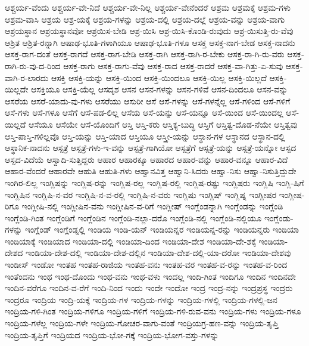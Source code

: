 {ಆಶ್ಚರ್ಯ-ವೆಂದು
ಆಶ್ಚರ್ಯ-ವೇ-ನಿದೆ
ಆಶ್ಚರ್ಯ-ವೇ-ನಿಲ್ಲ
ಆಶ್ಚರ್ಯ-ವೇನೆಂದರೆ
ಆಶ್ರಮ
ಆಶ್ರಮಕ್ಕೆ
ಆಶ್ರಮ-ಗಳು
ಆಶ್ರಮ-ವಾಸಿ
ಆಶ್ರಯ
ಆಶ್ರ-ಯಕ್ಕೆ
ಆಶ್ರಯ-ಗಳನ್ನು
ಆಶ್ರಯ-ದಲ್ಲಿ
ಆಶ್ರಯ-ದಲ್ಲೆ
ಆಶ್ರಯ-ವನ್ನು
ಆಶ್ರಯ-ವಾಗು
ಆಶ್ರಯಸ್ಥಾನ
ಆಶ್ರಯಸ್ಥಾನವೋ
ಆಶ್ರಯಿಸ-ಬೇಡಿ
ಆಶ್ರ-ಯಿಸಿ
ಆಶ್ರ-ಯಿಸಿ-ಕೊಂಡಿ-ರುವುದು
ಆಶ್ರ-ಯಿಸುತ್ತಿ-ರು-ವೆವು
ಆಶ್ರಿತ
ಆಶ್ರಿತ-ರನ್ನಾಗಿ
ಆಷಾಢ-ಭೂತಿ-ಗಳಾಗಿಯೂ
ಆಷಾಢ-ಭೂತಿ-ಗಳೂ
ಆಸಕ್ತ
ಆಸಕ್ತ-ನಾಗ-ಬೇಡ
ಆಸಕ್ತ-ನಾದನು
ಆಸಕ್ತ-ರಾಗ-ದಂತೆ
ಆಸಕ್ತ-ರಾಗದೆ
ಆಸಕ್ತ-ರಾಗ-ಬೇಡಿ
ಆಸಕ್ತ-ರಾಗಿ
ಆಸಕ್ತ-ರಾಗಿ-ರ-ಬೇಕು
ಆಸಕ್ತ-ರಾ-ಗಿ-ರು-ವರು
ಆಸಕ್ತ-ರಾಗಿ-ರು-ವು-ದ-ರಿಂದ
ಆಸಕ್ತ-ರಾಗು
ಆಸಕ್ತ-ರಾಗು-ವೆವು
ಆಸಕ್ತ-ರಾದ
ಆಸಕ್ತ-ರಾದರೆ
ಆಸಕ್ತ-ವಾ-ಗಿತ್ತು-ಏ-ಸುವು
ಆಸಕ್ತ-ವಾಗಿ-ರ-ಲಾರದು
ಆಸಕ್ತಿ
ಆಸಕ್ತಿ-ಯನ್ನು
ಆಸಕ್ತಿ-ಯಿಂದ
ಆಸಕ್ತಿ-ಯಿಂದಲೂ
ಆಸಕ್ತಿ-ಯಿಲ್ಲ
ಆಸಕ್ತಿ-ಯಿಲ್ಲದೆ
ಆಸಕ್ತಿ-ಯಿಲ್ಲದೇ
ಆಸಕ್ತಿಯೂ
ಆಸಕ್ತಿ-ಯೆಲ್ಲ
ಆಸದೃಶ
ಆಸನ
ಆಸನ-ಗಳನ್ನು
ಆಸನ-ಗಳಿವೆ
ಆಸನ-ದಿಂದಲೂ
ಆಸನ-ವನ್ನು
ಆಸರೆಯ
ಆಸರೆ-ಯಾದು-ವು-ಗಳು
ಆಸರೆಯು
ಆಸುರೀ
ಆಸೆ
ಆಸೆ-ಗಳನ್ನು
ಆಸೆ-ಗಳನ್ನೆಲ್ಲ
ಆಸೆ-ಗಳಿಂದ
ಆಸೆ-ಗಳಿಗೆ
ಆಸೆ-ಗಳು
ಆಸೆ-ಗಳೂ
ಆಸೆಗೆ
ಆಸೆ-ಪಡ-ಲಿಲ್ಲ
ಆಸೆಯ
ಆಸೆ-ಯನ್ನು
ಆಸೆ-ಯನ್ನೂ
ಆಸೆ-ಯಿಂದ
ಆಸೆ-ಯಿಂದಲ್ಲ
ಆಸೆ-ಯಿಲ್ಲದೆ
ಆಸೆಯೂ
ಆಸೆಯೇ
ಆಸೆ-ಯೊಂದಿಗೆ
ಆಸ್ತಿ
ಆಸ್ತಿ-ಕರು
ಆಸ್ತಿಕ್ಯ-ಬುದ್ಧಿ
ಆಸ್ತಿಗೆ
ಆಸ್ತಿತ್ವ-ದೊಡ-ನೆಯೇ
ಆಸ್ತಿತ್ವವು
ಆಸ್ತಿ-ಪಾಸ್ತಿ-ಗಳಿಲ್ಲವೊ
ಆಸ್ತಿ-ಯನ್ನು
ಆಸ್ತಿ-ಯಾದ
ಆಸ್ತಿಯೂ
ಆಸ್ತ್ರೀ-ಯನ್ನು
ಆಸ್ಥಾನ-ಗಳ
ಆಸ್ಥಾನದ
ಆಸ್ಥಾನ-ದಲ್ಲಿ
ಆಸ್ಥಾನಿಕ-ನಾದನು
ಆಸ್ಪತ್ರೆ
ಆಸ್ಪತ್ರೆ-ಗಳು-ಇ-ವನ್ನು
ಆಸ್ಪತ್ರೆ-ಗಾಗಿಯೋ
ಆಸ್ಪತ್ರೆಗೆ
ಆಸ್ಪತ್ರೆ-ಯನ್ನು
ಆಸ್ಪತ್ರೆ-ಯನ್ನೋ
ಆಸ್ಪದ
ಆಸ್ಪದ-ವಿದೆಯೆ
ಆಸ್ವಾದಿ-ಸುತ್ತಿದ್ದರು
ಆಹಾರ
ಆಹಾರಕ್ಕೂ
ಆಹಾರದ
ಆಹಾರ-ವನ್ನು
ಆಹಾರ-ವನ್ನೂ
ಆಹಾರ-ವಿದೆ
ಆಹಾರ-ವೆಂದರೆ
ಆಹಾರವೇ
ಆಹುತಿ
ಆಹುತಿ-ಗಳು
ಆಹ್ವಾನವಿತ್ತ
ಆಹ್ವಾನಿ-ಸಿದರು
ಆಹ್ವಾ-ನಿಸು
ಆಹ್ವಾ-ನಿಸುತ್ತಿದ್ದುದೇ
ಇಂಗಿರ-ಲಿಲ್ಲ
ಇಂಗ್ಲಿಷನ್ನು
ಇಂಗ್ಲಿಷ-ರನ್ನು
ಇಂಗ್ಲಿಷ-ರಲ್ಲ
ಇಂಗ್ಲಿಷ-ರಲ್ಲಿ
ಇಂಗ್ಲಿಷ-ರಷ್ಟು
ಇಂಗ್ಲಿಷರು
ಇಂಗ್ಲಿಷಿ
ಇಂಗ್ಲಿ-ಷಿಗೆ
ಇಂಗ್ಲಿಷಿನ
ಇಂಗ್ಲಿಷಿ-ನ-ವರ
ಇಂಗ್ಲಿಷಿ-ನ-ವ-ರಲ್ಲಿ
ಇಂಗ್ಲಿಷಿ-ನ-ವರು
ಇಂಗ್ಲಿಷು
ಇಂಗ್ಲಿಷ್
ಇಂಗ್ಲಿಷ್ನ
ಇಂಗ್ಲೀಷರ
ಇಂಗ್ಲೀಷ-ರಿಗೂ
ಇಂಗ್ಲೀಷಿ-ನಲ್ಲಿ
ಇಂಗ್ಲೀಷಿನ-ವನು
ಇಂಗ್ಲೀಷಿನ-ವ-ರಿಗೆ
ಇಂಗ್ಲೀಷ್
ಇಂಗ್ಲೆಂಡನ್ನಾಗಿ
ಇಂಗ್ಲೆಂಡನ್ನು
ಇಂಗ್ಲೆಂಡಿ
ಇಂಗ್ಲೆಂಡಿ-ಗಿಂತ
ಇಂಗ್ಲೆಂಡಿಗೆ
ಇಂಗ್ಲೆಂಡಿನ
ಇಂಗ್ಲೆಂಡಿ-ನಲ್ಲಾ-ದರೊ
ಇಂಗ್ಲೆಂಡಿ-ನಲ್ಲಿ
ಇಂಗ್ಲೆಂಡಿ-ನಲ್ಲಿಯೂ
ಇಂಗ್ಲೆಂಡು-ಗಳನ್ನು
ಇಂಗ್ಲೆಂಡ್
ಇಂಗ್ಲೆಂಡ್ನಲ್ಲಿ
ಇಂಡಿಯ
ಇಂಡಿ-ಯನ್
ಇಂಡಿಯನ್ನರ
ಇಂಡಿಯನ್ನ-ರನ್ನು
ಇಂಡಿಯನ್ನರು
ಇಂಡಿಯಾ
ಇಂಡಿಯಾಕ್ಕೆ
ಇಂಡಿಯಾದ
ಇಂಡಿಯಾ-ದಲ್ಲಿ
ಇಂಡಿಯಾ-ದಿಂದ
ಇಂಡಿಯಾ-ದೇಶ
ಇಂಡಿಯಾ-ದೇ-ಶಕ್ಕೆ
ಇಂಡಿಯಾ-ದೇಶದ
ಇಂಡಿಯಾ-ದೇಶ-ದಲ್ಲಿ
ಇಂಡಿಯಾ-ದೇಶ-ದಲ್ಲಿನ
ಇಂಡಿಯಾ-ದೇಶ-ದಲ್ಲಿ-ಯಾ-ದರೋ
ಇಂಡಿಯಾ-ದೇಶವು
ಇಂಡೀಸ್
ಇಂಡೋ
ಇಂತಹ
ಇಂತಹ-ರಾಜಿಯ
ಇಂತಹ-ವನು
ಇಂತಹ-ವರ
ಇಂತಹ-ವ-ರನ್ನು
ಇಂತಹ-ವ-ರಿಂದ
ಇಂತೆಂದನು
ಇಂಥ
ಇಂಥ-ದೊಂದು
ಇಂಥ-ವನು
ಇಂಥ-ವಳು
ಇಂದಲ್ಲ
ಇಂದಿ-ಗಿಂತ
ಇಂದಿಗೂ
ಇಂದಿನ
ಇಂದಿನದೇ
ಇಂದಿನ-ವರೆಗೂ
ಇಂದಿನ-ವ-ರೆಗೆ
ಇಂದಿ-ನಿಂದ
ಇಂದು
ಇಂದೇ
ಇಂದೋ
ಇಂದ್ರ
ಇಂದ್ರ-ನನ್ನು
ಇಂದ್ರಪ್ರಸ್ಥ
ಇಂದ್ರರು
ಇಂದ್ರರೂ
ಇಂದ್ರಿಯ
ಇಂದ್ರಿ-ಯಕ್ಕೆ
ಇಂದ್ರಿಯ-ಗಳ
ಇಂದ್ರಿಯ-ಗಳನ್ನು
ಇಂದ್ರಿಯ-ಗಳಲ್ಲಿ
ಇಂದ್ರಿಯ-ಗಳಲ್ಲಿ-ಜನ
ಇಂದ್ರಿಯ-ಗಳಿ-ಗಿಂತ
ಇಂದ್ರಿಯ-ಗಳಿಗೂ
ಇಂದ್ರಿಯ-ಗಳಿಗೆ
ಇಂದ್ರಿಯ-ಗಳಿ-ರುವ-ವನು
ಇಂದ್ರಿಯ-ಗಳು
ಇಂದ್ರಿಯ-ಗಳೂ
ಇಂದ್ರಿಯ-ಗಳೆಲ್ಲ
ಇಂದ್ರಿಯ-ಗಳೇ
ಇಂದ್ರಿಯ-ಗೋಚರ-ವಾಗು-ವಂತೆ
ಇಂದ್ರಿಯಗ್ರ-ಹಣ-ವನ್ನು
ಇಂದ್ರಿಯ-ತೃಪ್ತಿ
ಇಂದ್ರಿಯ-ತೃಪ್ತಿಗೆ
ಇಂದ್ರಿಯದ
ಇಂದ್ರಿಯ-ಭೋ-ಗಕ್ಕೆ
ಇಂದ್ರಿಯ-ಭೋಗ-ವಸ್ತು-ಗಳನ್ನು
}
